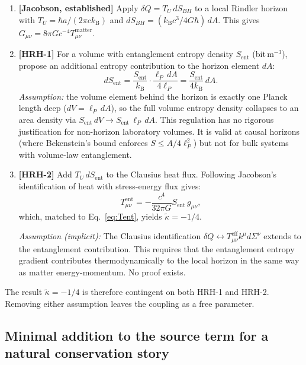 \documentclass[12pt,letterpaper]{article}
\theoremstyle{plain}
\theoremstyle{definition}
\theoremstyle{remark}
\newcommand{\kB}{k_{\mathrm{B}}}
\newcommand{\lP}{\ell_{P}}
\newcommand{\kt}{\tilde{\kappa}}
\newcommand{\Sent}{S_{\mathrm{ent}}}
\begin{document}
\begin{enumerate}[label=\textbf{Step \arabic*}]
  \item \textbf{[Jacobson, established]} Apply $\delta Q = T_U\,dS_{BH}$ to a local
    Rindler horizon with $T_U = \hbar a/(2\pi c\kB)$ and
    $dS_{BH} = (\kB c^3/4G\hbar)\,dA$.  This gives $G_{\mu\nu} = 8\pi G c^{-4}T^{\mathrm{matter}}_{\mu\nu}$.

  \item \textbf{[HRH-1]} For a volume with entanglement entropy density $\Sent$ (bit\,m$^{-3}$),
    propose an additional entropy contribution to the horizon element $dA$:
    \begin{equation}
      dS_{\mathrm{ent}} = \frac{\Sent}{\kB}\cdot\frac{\lP\,dA}{4\lP}
      = \frac{\Sent}{4\kB}\,dA.
      \label{eq:dSent}
    \end{equation}
    \textit{Assumption:} the volume element behind the horizon is exactly one Planck length
    deep ($dV = \lP\,dA$), so the full volume entropy density collapses to an area density
    via $\Sent\,dV \to \Sent\,\lP\,dA$.  This regulation has no rigorous justification
    for non-horizon laboratory volumes.  It is valid at causal horizons (where
    Bekenstein's bound enforces $S \leq A/4\lP^2$) but not for bulk systems with volume-law
    entanglement.

  \item \textbf{[HRH-2]} Add $T_U\,dS_{\mathrm{ent}}$ to the Clausius heat flux.
    Following Jacobson's identification of heat with stress-energy flux gives:
    \begin{equation}
      T^{\mathrm{ent}}_{\mu\nu} = -\frac{c^4}{32\pi G}\Sent\,g_{\mu\nu},
      \label{eq:Tent-derived}
    \end{equation}
    which, matched to Eq.~\eqref{eq:Tent}, yields $\kt = -1/4$.

    \textit{Assumption (implicit):} The Clausius identification $\delta Q \leftrightarrow
    T^{\mathrm{eff}}_{\mu\nu}k^\mu d\Sigma^\nu$ extends to the entanglement contribution.
    This requires that the entanglement entropy gradient contributes thermodynamically
    to the local horizon in the same way as matter energy-momentum.  No proof exists.
\end{enumerate}

The result $\kt = -1/4$ is therefore contingent on both HRH-1 and HRH-2.  Removing either
assumption leaves the coupling as a free parameter.

\subsection{Minimal addition to the source term for a natural conservation story}
\end{document}
